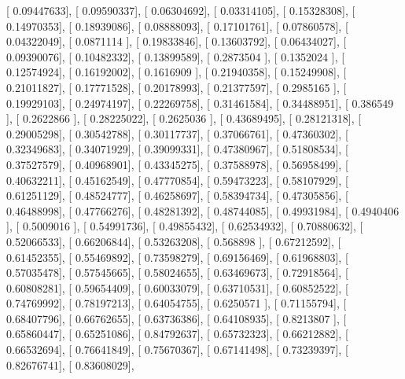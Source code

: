 \documentclass{article}
\begin{document}
       [ 0.09447633],
       [ 0.09590337],
       [ 0.06304692],
       [ 0.03314105],
       [ 0.15328308],
       [ 0.14970353],
       [ 0.18939086],
       [ 0.08888093],
       [ 0.17101761],
       [ 0.07860578],
       [ 0.04322049],
       [ 0.0871114 ],
       [ 0.19833846],
       [ 0.13603792],
       [ 0.06434027],
       [ 0.09390076],
       [ 0.10482332],
       [ 0.13899589],
       [ 0.2873504 ],
       [ 0.1352024 ],
       [ 0.12574924],
       [ 0.16192002],
       [ 0.1616909 ],
       [ 0.21940358],
       [ 0.15249908],
       [ 0.21011827],
       [ 0.17771528],
       [ 0.20178993],
       [ 0.21377597],
       [ 0.2985165 ],
       [ 0.19929103],
       [ 0.24974197],
       [ 0.22269758],
       [ 0.31461584],
       [ 0.34488951],
       [ 0.386549  ],
       [ 0.2622866 ],
       [ 0.28225022],
       [ 0.2625036 ],
       [ 0.43689495],
       [ 0.28121318],
       [ 0.29005298],
       [ 0.30542788],
       [ 0.30117737],
       [ 0.37066761],
       [ 0.47360302],
       [ 0.32349683],
       [ 0.34071929],
       [ 0.39099331],
       [ 0.47380967],
       [ 0.51808534],
       [ 0.37527579],
       [ 0.40968901],
       [ 0.43345275],
       [ 0.37588978],
       [ 0.56958499],
       [ 0.40632211],
       [ 0.45162549],
       [ 0.47770854],
       [ 0.59473223],
       [ 0.58107929],
       [ 0.61251129],
       [ 0.48524777],
       [ 0.46258697],
       [ 0.58394734],
       [ 0.47305856],
       [ 0.46488998],
       [ 0.47766276],
       [ 0.48281392],
       [ 0.48744085],
       [ 0.49931984],
       [ 0.4940406 ],
       [ 0.5009016 ],
       [ 0.54991736],
       [ 0.49855432],
       [ 0.62534932],
       [ 0.70880632],
       [ 0.52066533],
       [ 0.66206844],
       [ 0.53263208],
       [ 0.568898  ],
       [ 0.67212592],
       [ 0.61452355],
       [ 0.55469892],
       [ 0.73598279],
       [ 0.69156469],
       [ 0.61968803],
       [ 0.57035478],
       [ 0.57545665],
       [ 0.58024655],
       [ 0.63469673],
       [ 0.72918564],
       [ 0.60808281],
       [ 0.59654409],
       [ 0.60033079],
       [ 0.63710531],
       [ 0.60852522],
       [ 0.74769992],
       [ 0.78197213],
       [ 0.64054755],
       [ 0.6250571 ],
       [ 0.71155794],
       [ 0.68407796],
       [ 0.66762655],
       [ 0.63736386],
       [ 0.64108935],
       [ 0.8213807 ],
       [ 0.65860447],
       [ 0.65251086],
       [ 0.84792637],
       [ 0.65732323],
       [ 0.66212882],
       [ 0.66532694],
       [ 0.76641849],
       [ 0.75670367],
       [ 0.67141498],
       [ 0.73239397],
       [ 0.82676741],
       [ 0.83608029],
\end{document}
